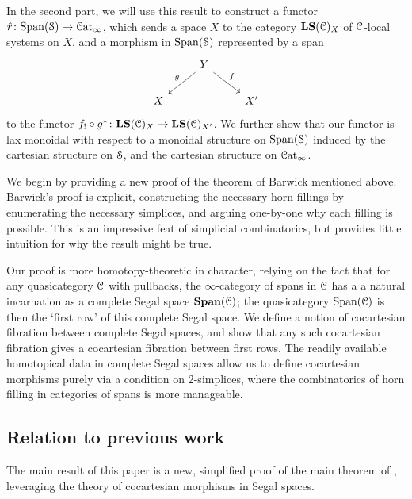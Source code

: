 \documentclass[main.tex]{subfiles}
\begin{document}
In the second part, we will use this result to construct a functor $\hat{r}\colon \Span(\category{S}) \to \ICat$, which sends a space $X$ to the category $\LS(\category{C})_{X}$ of $\category{C}$-local systems on $X$, and a morphism in $\Span(\S)$ represented by a span
\begin{equation*}
  \begin{tikzcd}
    & Y
    \arrow[dl, swap, "g"]
    \arrow[dr, "f"]
    \\
    X
    && X'
  \end{tikzcd}
\end{equation*}
to the functor $f_{!} \circ g^{*}\colon \LS(\category{C})_{X} \to \LS(\category{C})_{X'}$. We further show that our functor is lax monoidal with respect to a monoidal structure on $\Span(\S)$ induced by the cartesian structure on $\S$, and the cartesian structure on $\ICat$.

We begin by providing a new proof of the theorem of Barwick mentioned above. Barwick's proof is explicit, constructing the necessary horn fillings by enumerating the necessary simplices, and arguing one-by-one why each filling is possible. This is an impressive feat of simplicial combinatorics, but provides little intuition for why the result might be true.

Our proof is more homotopy-theoretic in character, relying on the fact that for any quasicategory $\category{C}$ with pullbacks, the $\infty$-category of spans in $\category{C}$ has a a natural incarnation as a complete Segal space $\SPAN(\category{C})$; the quasicategory $\Span(\category{C})$ is then the `first row' of this complete Segal space. We define a notion of cocartesian fibration between complete Segal spaces, and show that any such cocartesian fibration gives a cocartesian fibration between first rows. The readily available homotopical data in complete Segal spaces allow us to define cocartesian morphisms purely via a condition on 2-simplices, where the combinatorics of horn filling in categories of spans is more manageable.

\subsection{Relation to previous work}
\label{ssc:relation_to_previous_work}

The main result of this paper is a new, simplified proof of the main theorem of \cite{spectralmackeyfunctors1}, leveraging the theory of cocartesian morphisms in Segal spaces.
\end{document}
